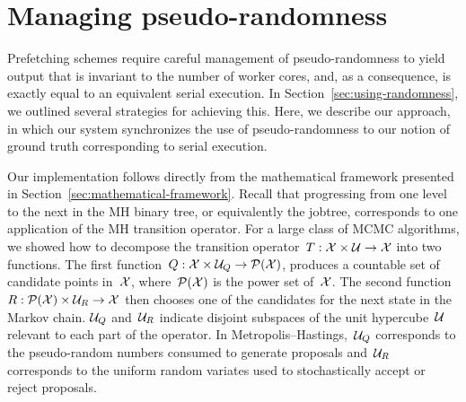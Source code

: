 \documentclass[angelino.tex]{subfiles}
\begin{document}
%


\section{Managing pseudo-randomness}
\label{sec:handling-randomness}

Prefetching schemes require careful management of pseudo-randomness to yield
output that is invariant to the number of worker cores, and, as a consequence, 
is exactly equal to an equivalent serial execution.
%
In Section~\ref{sec:using-randomness}, we outlined several strategies for
achieving this.
%
Here, we describe our approach, in which our system synchronizes the use of
pseudo-randomness to our notion of ground truth corresponding to serial execution.

Our implementation follows directly from the mathematical framework
presented in Section~\ref{sec:mathematical-framework}.
%
Recall that progressing from one level to the next in the MH binary tree,
or equivalently the jobtree, corresponds to one application of the MH transition 
operator.
%
For a large class of MCMC algorithms, we showed how to decompose the
transition operator~${T:{\mathcal X}\times\mathcal{U}\to{\mathcal X}}$ into two functions.
%
The first function~${Q:{\mathcal X}\times\mathcal{U}_Q\to\mathcal{P}({\mathcal X})}$, produces a countable set of
candidate points in~${\mathcal X}$, where~$\mathcal{P}({\mathcal X})$ is the power set of~${\mathcal X}$.
%
The second function~${R:\mathcal{P}({\mathcal X})\times\mathcal{U}_R\to{\mathcal X}}$ then chooses one of the 
candidates for the next state in the Markov chain.
%
$\mathcal{U}_Q$ and~$\mathcal{U}_R$ indicate disjoint subspaces of the unit hypercube~$\mathcal{U}$
relevant to each part of the operator.
%
%
In Metropolis--Hastings,~$\mathcal{U}_Q$ corresponds to the pseudo-random numbers 
consumed to generate proposals and~$\mathcal{U}_R$ corresponds to the uniform random
variates used to stochastically accept or reject proposals.
\end{document}
